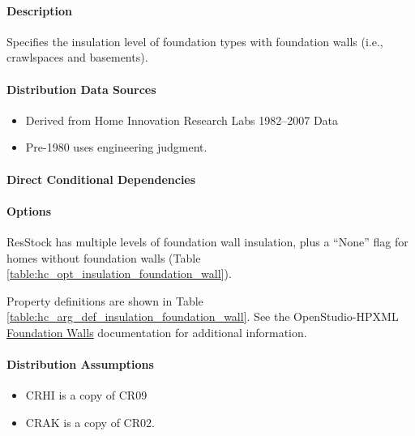 \paragraph{Description}
% 
Specifies the insulation level of foundation types with foundation walls (i.e., crawlspaces and basements).

\paragraph{Distribution Data Sources}
% 
\begin{itemize}

\item
  Derived from Home Innovation Research Labs 1982--2007 Data
\item
  Pre-1980 uses engineering judgment.
\end{itemize}

\paragraph{Direct Conditional Dependencies}


\paragraph{Options}
ResStock has multiple levels of foundation wall insulation, plus a ``None'' flag for homes without foundation walls (Table \ref{table:hc_opt_insulation_foundation_wall}).



Property definitions are shown in Table \ref{table:hc_arg_def_insulation_foundation_wall}. See the OpenStudio-HPXML \href{https://openstudio-hpxml.readthedocs.io/en/v1.10.0/workflow_inputs.html\#hpxml-foundation-walls}{Foundation Walls} documentation for additional information.



\paragraph{Distribution Assumptions}
% 
\begin{itemize}

\item
  CRHI is a copy of CR09
\item
  CRAK is a copy of CR02.
\end{itemize}
